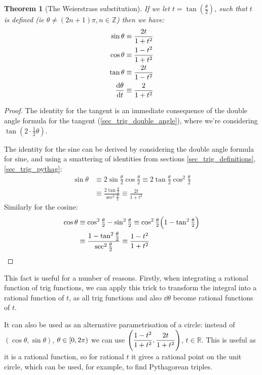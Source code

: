 \documentclass[fleqn,a4paper,11pt]{article}
\newcommand{\setstyle}{\mathbb}
\newcommand{\Integers}{\setstyle Z}
\newcommand{\Reals}{\setstyle R}
\newtheorem{theorem}{Theorem}[section]
\begin{document}
    \begin{theorem}[The Weierstrass substitution]
    If we let \(t = \tan(\frac \theta 2)\), such that \(t\) is defined (ie
    \(\theta \ne (2n + 1)\pi, n \in \Integers\)) then we have:
    \begin{align*}
    \sin \theta &\equiv \dfrac{2t}{1 + t^2} \\
    \cos \theta &\equiv \dfrac{1 - t^2}{1 + t^2} \\
    \tan \theta &\equiv \dfrac{2t}{1 - t^2} \\
    \dv{\theta}{t} &\equiv \dfrac{2}{1 + t^2}
    \end{align*}
    \end{theorem}
    \begin{proof}
    The identity for the tangent is an immediate consequence of the double
    angle formula for the tangent (\ref{sec_trig_double_angle}), where we're
    considering \(\tan(2 \cdot \frac 12 \theta)\).

    The identity for the sine can be derived by considering the double angle
    formula for sine, and using a smattering of identities from sections
    \ref{sec_trig_definitions}, \ref{sec_trig_pythag}:
    \begin{align*}
    \sin \theta &\equiv 2\sin \tfrac \theta 2 \cos\tfrac \theta 2
        \equiv 2\tan \tfrac \theta 2 \cos^2 \tfrac \theta 2 \\
        &\equiv \frac{2\tan \frac \theta 2}{\sec^2 \frac \theta 2}
        \equiv \frac{2t}{1 + t^2}
    \end{align*}
    Similarly for the cosine:
    \begin{align*}
    \cos \theta
        &\equiv \cos^2 \tfrac \theta 2 - \sin^2 \tfrac \theta 2
        \equiv \cos^2 \tfrac \theta 2
            \pqty{1 - \tan^2 \tfrac \theta 2} \\
        &\equiv \frac{1 - \tan^2 \tfrac \theta 2}
                     {\sec^2 \tfrac \theta 2}
        \equiv \frac{1 - t^2}{1 + t^2} \qedhere
    \end{align*}
    \end{proof}

    This fact is useful for a number of reasons. Firstly, when integrating a
    rational function of trig functions, we can apply this trick to transform
    the integral into a rational function of \(t\), as all trig functions and
    also \(\dd{\theta}\) become rational functions of \(t\).

    It can also be used as an alternative parametrisation of a circle: instead
    of \((\cos\theta, \sin\theta)\), \(\theta \in \intco{0, 2\pi}\) we can use
    \(\pqty{\dfrac{1 - t^2}{1 + t^2}, \dfrac{2t}{1 + t^2}}\), \(t \in \Reals\).
    This is useful as it is a rational function, so for rational \(t\) it gives
    a rational point on the unit circle, which can be used, for example, to find
    Pythagorean triples.
\end{document}
